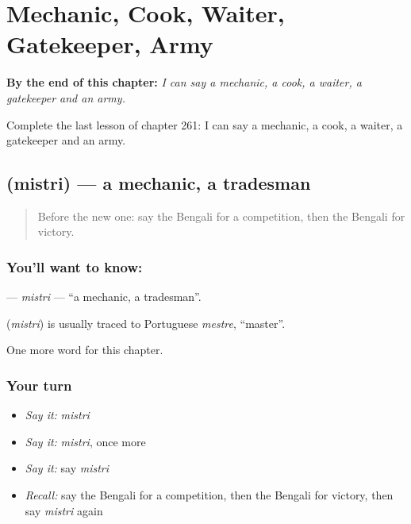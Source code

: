 
\chapter{Mechanic, Cook, Waiter, Gatekeeper, Army}
\label{ch:bn-mechanic-cook-waiter-gatekeeper-army}

\begin{chapteropening}
\textbf{By the end of this chapter:} \emph{I can say a mechanic, a cook, a waiter, a gatekeeper and an army.}

Complete the last lesson of chapter 261: I can say a mechanic, a cook, a waiter, a gatekeeper and an army.
\end{chapteropening}

\section[\texorpdfstring{\bn{মিস্ত্রি} (mistri)}{মিস্ত্রি (mistri)}]{ (mistri) — a mechanic, a tradesman}

\label{lesson:BN-C261-mistri}



\begin{quote}
Before the new one: say the Bengali for a competition, then the Bengali for victory.
\end{quote}

\subsection*{You'll want to know: }
\textbf{} — \emph{mistri} — \textquotedblleft{}a mechanic, a tradesman\textquotedblright{}.

\begin{cousinweb}
\textbf{} (\emph{mistri}) is usually traced to Portuguese \emph{mestre}, \textquotedblleft{}master\textquotedblright{}.
\end{cousinweb}

\begin{grammarlens}[title={What you've built}]
One more word for this chapter.
\end{grammarlens}

\subsection*{Your turn}
\begin{itemize}
\raggedright
  \item \emph{Say it:} \emph{mistri}
  \item \emph{Say it:} \emph{mistri}, once more
  \item \emph{Say it:} say \emph{mistri}
  \item \emph{Recall:} say the Bengali for a competition, then the Bengali for victory, then say \emph{mistri} again
\end{itemize}


